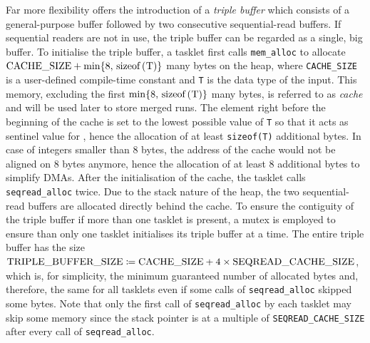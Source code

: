 Far more flexibility offers the introduction of a \emph{triple buffer} which consists of a general-purpose buffer followed by two consecutive sequential-read buffers.
If sequential readers are not in use, the triple buffer can be regarded as a single, big buffer.
To initialise the triple buffer, a tasklet first calls \lstinline|mem_alloc| to allocate \(\text{\lstinline|CACHE_SIZE|} + \min\braces{ 8, \text{\lstinline|sizeof(T)|} }\) many bytes on the heap, where \lstinline|CACHE_SIZE| is a user-defined compile-time constant and \lstinline|T| is the data type of the input.
This memory, excluding the first \(\min\braces{ 8, \text{\lstinline|sizeof(T)|} }\) many bytes, is referred to as \emph{cache} and will be used later to store merged runs.
The element right before the beginning of the cache is set to the lowest possible value of \lstinline|T| so that it acts as sentinel value for \IS{}, hence the allocation of at least \lstinline|sizeof(T)| additional bytes.
In case of integers smaller than 8 bytes, the address of the cache would not be aligned on 8 bytes anymore, hence the allocation of at least 8 additional bytes to simplify DMAs.
After the initialisation of the cache, the tasklet calls \lstinline|seqread_alloc| twice.
Due to the stack nature of the heap, the two sequential-read buffers are allocated directly behind the cache.
To ensure the contiguity of the triple buffer if more than one tasklet is present, a mutex is employed to ensure than only one tasklet initialises its triple buffer at a time.
The entire triple buffer has the size \(\text{\lstinline|TRIPLE_BUFFER_SIZE|} \coloneqq \text{\lstinline|CACHE_SIZE|} + 4 \times \text{\lstinline|SEQREAD_CACHE_SIZE|}\), which is, for simplicity, the minimum guaranteed number of allocated bytes and, therefore, the same for all tasklets even if some calls of \lstinline|seqread_alloc| skipped some bytes.
Note that only the first call of \lstinline|seqread_alloc| by each tasklet may skip some memory since the stack pointer is at a multiple of \lstinline|SEQREAD_CACHE_SIZE| after every call of \lstinline|seqread_alloc|.
